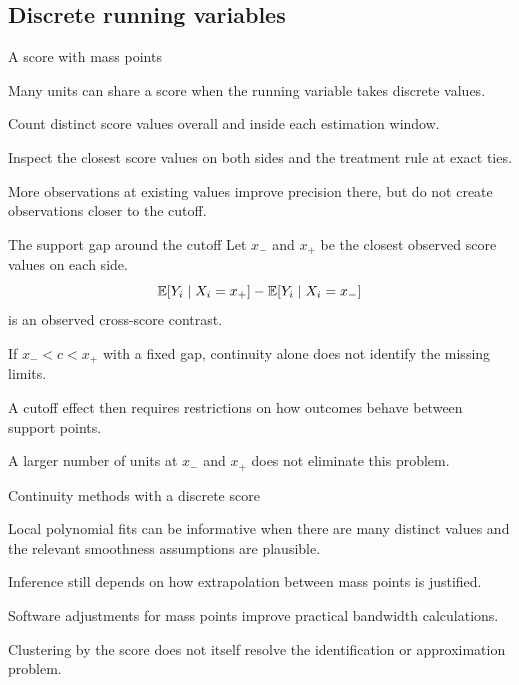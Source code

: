 \subsection{Discrete running variables}
\begin{frame}{A score with mass points}
\begin{items}
\item Many units can share a score when the running variable takes discrete values.
\item Count distinct score values overall and inside each estimation window.
\item Inspect the closest score values on both sides and the treatment rule at exact ties.
\item More observations at existing values improve precision there, but do not create observations closer to the cutoff.
\end{items}
\end{frame}

\begin{frame}{The support gap around the cutoff}
Let $x_-$ and $x_+$ be the closest observed score values on each side.
\[
\mathbb{E}[Y_i\mid X_i=x_+]-\mathbb{E}[Y_i\mid X_i=x_-]
\]
is an observed cross-score contrast.
\begin{items}
\item If $x_-<c<x_+$ with a fixed gap, continuity alone does not identify the missing limits.
\item A cutoff effect then requires restrictions on how outcomes behave between support points.
\item A larger number of units at $x_-$ and $x_+$ does not eliminate this problem.
\end{items}
\end{frame}

\begin{frame}{Continuity methods with a discrete score}
\begin{items}
\item Local polynomial fits can be informative when there are many distinct values and the relevant smoothness assumptions are plausible.
\item Inference still depends on how extrapolation between mass points is justified.
\item Software adjustments for mass points improve practical bandwidth calculations.
\item Clustering by the score does not itself resolve the identification or approximation problem.
\end{items}
\end{frame}


